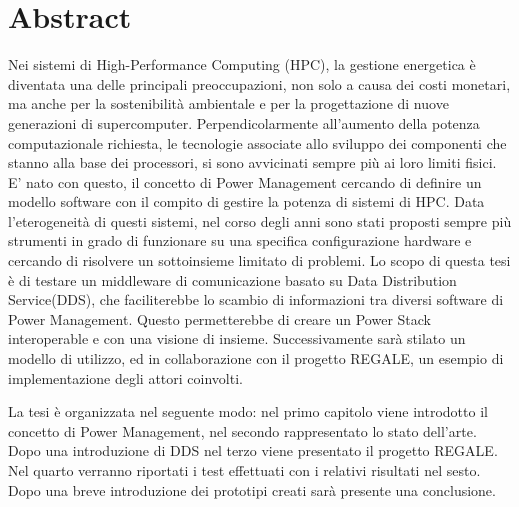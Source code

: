 \section*{Abstract}
\label{TODO}
Nei sistemi di High-Performance Computing (HPC), la gestione energetica è diventata una delle principali preoccupazioni, non solo a causa dei costi monetari, ma anche per la sostenibilità ambientale e per la progettazione di nuove generazioni di supercomputer\cite{growth}. Perpendicolarmente all'aumento della potenza computazionale richiesta, le tecnologie associate allo sviluppo dei componenti che stanno alla base dei processori, si sono avvicinati sempre più ai loro limiti fisici. E' nato con questo, il concetto di Power Management cercando di definire un modello software con il compito di gestire la potenza di sistemi di HPC. Data l'eterogeneità di questi sistemi, nel corso degli anni sono stati proposti sempre più strumenti in grado di funzionare su una specifica configurazione hardware e cercando di risolvere un sottoinsieme limitato di problemi. %
Lo scopo di questa tesi è di testare un middleware di comunicazione basato su Data Distribution Service(DDS), che faciliterebbe lo scambio di informazioni tra diversi software di Power Management. Questo permetterebbe di creare un Power Stack interoperable e con una visione di insieme. Successivamente sarà stilato un modello di utilizzo, ed in collaborazione con il progetto REGALE, un esempio di implementazione degli attori coinvolti.

La tesi è organizzata nel seguente modo: nel primo capitolo viene introdotto il concetto di Power Management, nel secondo rappresentato lo stato dell'arte. Dopo una introduzione di DDS nel terzo viene presentato il progetto REGALE. Nel quarto verranno riportati i test effettuati con i relativi risultati nel sesto. Dopo una breve introduzione dei prototipi creati sarà presente una conclusione.

